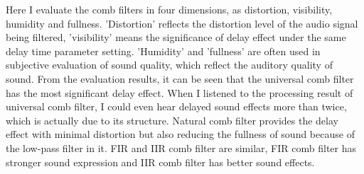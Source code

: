 \documentclass[a4paper]{tufte-handout} %
\begin{document}
Here I evaluate the comb filters in four dimensions, as distortion, visibility, humidity and fullness. 'Distortion' reflects the distortion level of the audio signal being filtered, 'visibility' means the significance of delay effect under the same delay time parameter setting. 'Humidity' and 'fullness' are often used in subjective evaluation of sound quality, which reflect the auditory quality of sound. From the evaluation results, it can be seen that the universal comb filter has the most significant delay effect. When I listened to the processing result of universal comb filter, I could even hear delayed sound effects more than twice, which is actually due to its structure. Natural comb filter provides the delay effect with minimal distortion but also reducing the fullness of sound because of the low-pass filter in it. FIR and IIR comb filter are similar, FIR comb filter has stronger sound expression and IIR comb filter has better sound effects.
\end{document}
